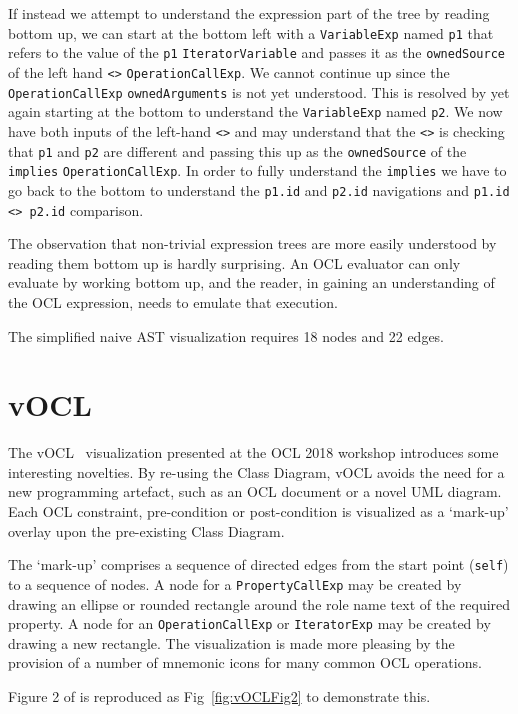 \documentclass{llncs}
\begin{document}
If instead we attempt to understand the expression part of the tree by reading bottom up, we can start at the bottom left with a \verb$VariableExp$ named \verb$p1$ that refers to the value of the \verb$p1$ \verb$IteratorVariable$ and passes it as the \verb$ownedSource$ of the left hand \verb$<>$ \verb$OperationCallExp$. We cannot continue up since the \verb$OperationCallExp$ \verb$ownedArguments$ is not yet understood. This is resolved by yet again starting at the bottom to understand the \verb$VariableExp$ named \verb$p2$. We now have both inputs of the left-hand \verb$<>$ and may understand that the \verb$<>$ is checking that \verb$p1$ and \verb$p2$ are different and passing this up as the \verb$ownedSource$ of the \verb$implies$ \verb$OperationCallExp$. In order to fully understand the \verb$implies$ we have to go back to the bottom to understand the \verb$p1.id$ and \verb$p2.id$ navigations and \verb$p1.id <> p2.id$ comparison.

The observation that non-trivial expression trees are more easily understood by reading them bottom up is hardly surprising. An OCL evaluator can only evaluate by working bottom up, and the reader, in gaining an understanding of the OCL expression, needs to emulate that execution.

The simplified naive AST visualization requires 18 nodes and 22 edges.

\section{vOCL}\label{vOCL}

The vOCL~\cite{vOCL} visualization presented at the OCL 2018 workshop introduces some interesting novelties. By re-using the Class Diagram, vOCL avoids the need for a new programming artefact, such as an OCL document or a novel UML diagram. Each OCL constraint, pre-condition or post-condition is visualized as a `mark-up' overlay upon the pre-existing Class Diagram.

The `mark-up' comprises a sequence of directed edges from the start point (\verb$self$) to a sequence of nodes. A node for a \verb$PropertyCallExp$ may be created by drawing an ellipse or rounded rectangle around the role name text of the required property. A node for an \verb$OperationCallExp$ or \verb$IteratorExp$ may be created by drawing a new rectangle. The visualization is made more pleasing by the provision of a number of mnemonic icons for many common OCL operations.

Figure 2 of \cite{vOCL} is reproduced as Fig~\ref{fig:vOCLFig2} to demonstrate this.
\end{document}
